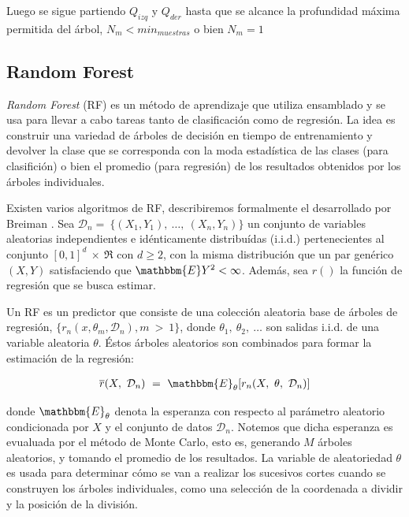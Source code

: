    Luego se sigue partiendo $Q_{izq}$ y $Q_{der}$ hasta que se alcance la profundidad
    máxima permitida del árbol, $N_{m} < min_{muestras}$ o bien $N_{m} = 1$


\subsection{Random Forest}

  \par \textit{Random Forest} (RF) es un método de aprendizaje que utiliza ensamblado y se
    usa para llevar a cabo tareas tanto de clasificación como de regresión.
    La idea es construir una variedad de árboles de decisión en tiempo de entrenamiento
    y devolver la clase que se corresponda con la moda estadística de las clases
    (para clasifición) o bien el promedio (para regresión) de los resultados
    obtenidos por los árboles individuales.

  \par Existen varios algoritmos de RF, describiremos formalmente el desarrollado
    por Breiman \cite{random_forest}.
    Sea $\mathcal{D}_{n} = \ \{ (X_{1}, Y_{1}), \ \dots, \ (X_{n}, Y_{n})\}$
    un conjunto de variables aleatorias independientes e idénticamente distribuídas (i.i.d.)
    pertenecientes al conjunto $[0,1]^{d} \ \times \ \Re $ con $d \geq 2$,
    con la misma distribución que un par genérico $(X,Y)$ satisfaciendo que
    $\mathbbm{E}Y^{2} < \infty$. Además, sea $r()$ la función de regresión que se busca estimar.

  \par Un RF es un predictor que consiste de una colección aleatoria base
    de árboles de regresión, $\{ r_{n}(x, \theta_{m}, \mathcal{D}_{n}), m \ > \ 1 \}$, donde
    $\theta_{1},\ \theta_{2},\ \dots$ son salidas i.i.d. de una variable aleatoria
    $\theta$. Éstos árboles aleatorios son combinados para formar la estimación
    de la regresión:

    \begin{align}
      \overline{r}(X,\ \mathcal{D}_{n})\ =\ \mathbbm{E}_{\theta}[r_{n}(X,\ \theta,\ \mathcal{D}_{n})]
    \end{align}

    donde $\mathbbm{E}_{\theta}$ denota la esperanza con respecto al parámetro aleatorio
    condicionada por $X$ y el conjunto de datos $\mathcal{D}_{n}$. Notemos que
    dicha esperanza es evualuada por el método de Monte Carlo\cite{monte_carlo},
    esto es, generando $M$ árboles aleatorios, y tomando el promedio de los resultados.
    La variable de aleatoriedad $\theta$ es usada para determinar cómo se van a realizar los
    sucesivos cortes cuando se construyen los árboles individuales, como una selección
    de la coordenada a dividir y la posición de la división.

